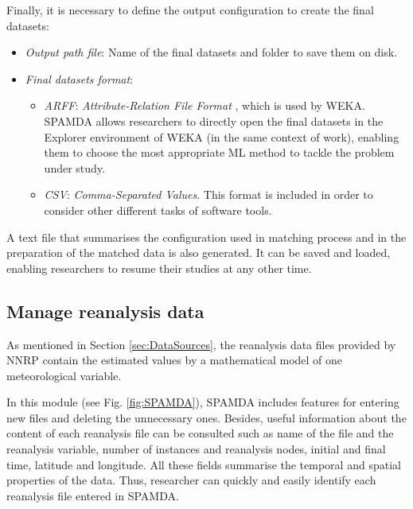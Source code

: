 \documentclass[energies,article,submit,moreauthors,pdftex]{Definitions/mdpi}
\begin{document}
				Finally, it is necessary to define the output configuration to create the final datasets:			
				\begin{itemize}

					\item \textit{Output path file}: Name of the final datasets and folder to save them on disk.
						
					\item \textit{Final datasets format}:

						\begin{itemize}
						
							\item \textit{ARFF}: \textit{Attribute-Relation File Format} \cite{WEKA_ARFF}, which is used by WEKA. SPAMDA allows researchers to directly open the final datasets in the Explorer environment of WEKA (in the same context of work), enabling them to choose the most appropriate ML method to tackle the problem under study.

							\item \textit{CSV}: \textit{Comma-Separated Values}. This format is included in order to consider other different tasks of software tools.
							
						\end{itemize}
					
				\end{itemize}
				
				A text file that summarises the configuration used in matching process and in the preparation of the matched data is also generated. It can be saved and loaded, enabling researchers to resume their studies at any other time.
				
				
			\subsection{Manage reanalysis data}
				
				As mentioned in Section \ref{sec:DataSources}, the reanalysis data files provided by NNRP contain the estimated values by a mathematical model of one meteorological variable.
				
				In this module (see Fig. \ref{fig:SPAMDA}), SPAMDA includes features for entering new files and deleting the unnecessary ones. Besides, useful information about the content of each reanalysis file can be consulted such as name of the file and the reanalysis variable, number of instances and reanalysis nodes, initial and final time, latitude and longitude. All these fields summarise the temporal and spatial properties of the data. Thus, researcher can quickly and easily identify each reanalysis file entered in SPAMDA.
				
\end{document}
